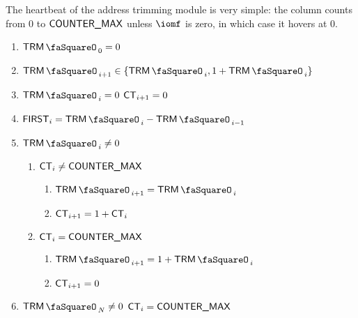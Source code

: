 The heartbeat of the address trimming module is very simple: the \ct{} column counts from $0$ to $\textsf{COUNTER\_MAX}$ unless $\iomf$ is zero, in which case it hovers at $0$.
\begin{enumerate}
	\item $\trmStamp_{0} = 0$
	\item $\trmStamp_{i + 1} \in \{ \trmStamp_{i}, 1 + \trmStamp_{i} \}$
	\item \If $\trmStamp_{i} = 0$ \Then $\textsf{CT}_{i+1} =  0 $
	\item $\first_{i} = \trmStamp_{i} - \trmStamp_{i-1}$
	\item \If $\trmStamp_{i} \neq 0$ \Then
		\begin{enumerate}
		\item \If $\textsf{CT}_{i} \neq \textsf{COUNTER\_MAX}$ \Then
			\begin{enumerate}
			    \item $\trmStamp_{i+1} = \trmStamp_{i}$
			    \item $\textsf{CT}_{i + 1} = 1 + \textsf{CT}_{i}$
			\end{enumerate}

		\item \If $\textsf{CT}_{i} = \textsf{COUNTER\_MAX}$ \Then
			\begin{enumerate}
			    \item $\trmStamp_{i+1} = 1 + \trmStamp_{i}$
			    \item $\textsf{CT}_{i + 1} = 0$
			\end{enumerate}
	\end{enumerate}
	\item \If $\trmStamp_{N} \neq 0$ \Then $\textsf{CT}_{i} = \textsf{COUNTER\_MAX}$
\end{enumerate}
